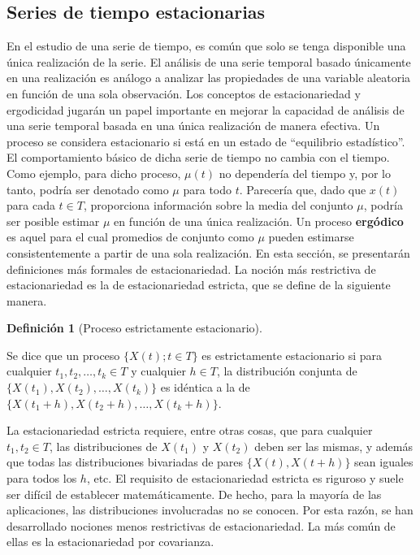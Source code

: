 \documentclass[
  us-letterpaper,
]{scrreprt}
\theoremstyle{plain}
\theoremstyle{definition}
\newtheorem{definition}{Definición}[chapter]
\theoremstyle{definition}
\theoremstyle{plain}
\theoremstyle{remark}
\begin{document}
\subsection{Series de tiempo
estacionarias}\label{series-de-tiempo-estacionarias}

En el estudio de una serie de tiempo, es común que solo se tenga
disponible una única realización de la serie. El análisis de una serie
temporal basado únicamente en una realización es análogo a analizar las
propiedades de una variable aleatoria en función de una sola
observación. Los conceptos de estacionariedad y ergodicidad jugarán un
papel importante en mejorar la capacidad de análisis de una serie
temporal basada en una única realización de manera efectiva. Un proceso
se considera estacionario si está en un estado de ``equilibrio
estadístico''. El comportamiento básico de dicha serie de tiempo no
cambia con el tiempo. Como ejemplo, para dicho proceso, \(\mu(t)\) no
dependería del tiempo y, por lo tanto, podría ser denotado como \(\mu\)
para todo \(t\). Parecería que, dado que \(x(t)\) para cada \(t\in T\),
proporciona información sobre la media del conjunto \(\mu\), podría ser
posible estimar \(\mu\) en función de una única realización. Un proceso
\textbf{ergódico} es aquel para el cual promedios de conjunto como
\(\mu\) pueden estimarse consistentemente a partir de una sola
realización. En esta sección, se presentarán definiciones más formales
de estacionariedad. La noción más restrictiva de estacionariedad es la
de estacionariedad estricta, que se define de la siguiente manera.

\begin{definition}[Proceso estrictamente
estacionario]\protect\hypertarget{def-PPE}{}\label{def-PPE}

Se dice que un proceso \(\{X(t); t \in T\}\) es estrictamente
estacionario si para cualquier \(t_1, t_2,\ldots, t_k \in T\) y
cualquier \(h \in T\), la distribución conjunta de
\(\{X(t_1), X(t_2),\ldots , X(t_k)\}\) es idéntica a la de
\(\{X(t_1 + h), X(t_2 + h),\ldots, X(t_k + h)\}\).

\end{definition}

La estacionariedad estricta requiere, entre otras cosas, que para
cualquier \(t_1, t_2 \in T\), las distribuciones de \(X(t_1)\) y
\(X(t_2)\) deben ser las mismas, y además que todas las distribuciones
bivariadas de pares \(\{X(t), X(t + h)\}\) sean iguales para todos los
\(h\), etc. El requisito de estacionariedad estricta es riguroso y suele
ser difícil de establecer matemáticamente. De hecho, para la mayoría de
las aplicaciones, las distribuciones involucradas no se conocen. Por
esta razón, se han desarrollado nociones menos restrictivas de
estacionariedad. La más común de ellas es la estacionariedad por
covarianza.
\end{document}
